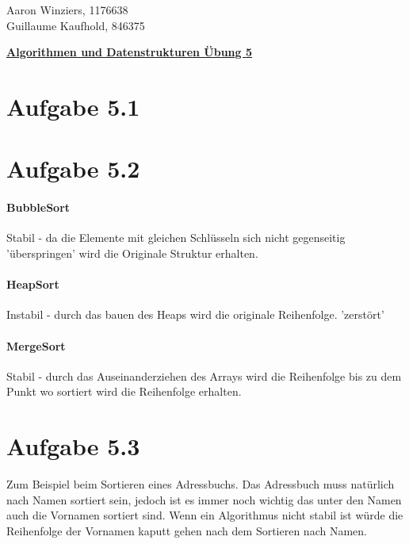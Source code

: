 \documentclass[10pt,a4paper]{article}
\begin{document}
	\begin{flushright}
		Aaron Winziers, 1176638	\\
		Guillaume Kaufhold, 846375
	\end{flushright}
	\begin{center}
		\underline{\textbf{Algorithmen und Datenstrukturen Übung 5}}
	\end{center}
	\section*{Aufgabe 5.1}		
	
	\section*{Aufgabe 5.2}
	\paragraph{BubbleSort} Stabil - da die Elemente mit gleichen Schlüsseln sich nicht gegenseitig 'überspringen' wird die Originale Struktur erhalten.
	
	\paragraph{HeapSort} Instabil - durch das bauen des Heaps wird die originale Reihenfolge. 'zerstört'
	
	\paragraph{MergeSort} Stabil - durch das Auseinanderziehen des Arrays wird die Reihenfolge bis zu dem Punkt wo sortiert wird die Reihenfolge erhalten.
	
	
	\section*{Aufgabe 5.3}
		Zum Beispiel beim Sortieren eines Adressbuchs. Das Adressbuch muss natürlich nach Namen sortiert sein, jedoch ist es immer noch wichtig das unter den Namen auch die Vornamen sortiert sind. Wenn ein Algorithmus nicht stabil ist würde die Reihenfolge der Vornamen kaputt gehen nach dem Sortieren nach Namen.
		
\end{document}
